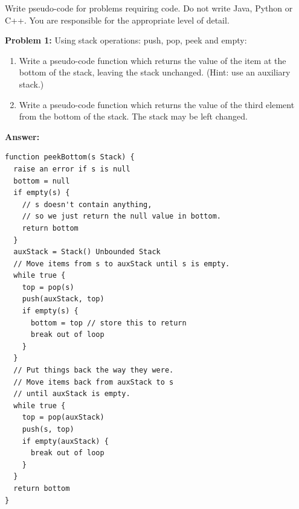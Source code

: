\documentclass[12pt,letterpaper,final]{report}
\begin{document}
\vline

Write pseudo-code for problems requiring code. Do not write Java, Python or C++. You are responsible for the appropriate level of detail.

\medskip

\noindent\textbf{Problem 1:}
Using stack operations: push, pop, peek and empty:

\begin{enumerate}
  \item Write a pseudo-code function which returns the value of the item at the bottom of the stack, leaving the stack unchanged. (Hint: use an auxiliary stack.)
  \item Write a pseudo-code function which returns the value of the third element from the bottom of the stack. The stack may be left changed.
\end{enumerate}

\pagebreak
\noindent\textbf{Answer:}

\begin{mdframed}
  \begin{verbatim}
function peekBottom(s Stack) {
  raise an error if s is null
  bottom = null
  if empty(s) {
    // s doesn't contain anything,
    // so we just return the null value in bottom.
    return bottom
  }
  auxStack = Stack() Unbounded Stack
  // Move items from s to auxStack until s is empty.
  while true {
    top = pop(s)
    push(auxStack, top)
    if empty(s) {
      bottom = top // store this to return
      break out of loop
    }
  }
  // Put things back the way they were.
  // Move items back from auxStack to s
  // until auxStack is empty.
  while true {
    top = pop(auxStack)
    push(s, top)
    if empty(auxStack) {
      break out of loop
    }
  }
  return bottom
}
\end{verbatim}
\end{mdframed}
\end{document}
